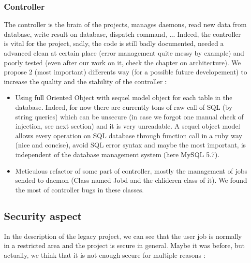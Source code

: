 \documentclass{eplmastersthesis}
\begin{document}
        \subsubsection{Controller}

          The controller is the brain of the projects, manages daemons, read new data from database,
          write result on database, dispatch command, ... Indeed, the controller is vital for the project,
          sadly, the code is still badly documented, needed a advanced clean at certain place (error management quite messy by example)
          and poorly tested (even after our work on it, check the chapter on architecture). We propose
          2 (most important) differents way (for a possible future developement) to increase the quality and the stability of the controller :

          \begin{itemize}
            \item Using full Oriented Object with sequel \cite{Sequel} model object for each table in the database.
            Indeed, for now there are currently tons of raw call of SQL (by string queries) which can be unsecure (in case
            we forgot one manual check of injection, see next section) and it is very unreadable. A sequel object model allows
            every operation on SQL database through function call in a ruby way (nice and concise), avoid SQL error syntax and
            maybe the most important, is independent of the database management system (here MySQL 5.7).
            \item Meticulous refactor of some part of controller, mostly the management of jobs sended to daemon
            (Class named Jobd and the chlideren class of it). We found the most of controller bugs in these classes.
          \end{itemize}

      \subsection{Security aspect}

        In the description of the legacy project, we can see that the user job is normally in a restricted area and the project
        is secure in general. Maybe it was before, but actually, we think that it is not enough secure for multiple reasons :
\end{document}
